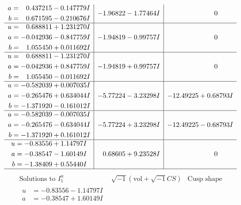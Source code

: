 \documentclass[1p]{elsarticle_modified}
\theoremstyle{definition}
\newcommand{\I}{\sqrt{-1}}
\begin{document}
$$\begin{array}{c|c|c}
\begin{aligned}
a &= \phantom{-}0.437215 - 0.147779 I \\
b &= \phantom{-}0.671595 - 0.210676 I\end{aligned}
 & -1.96822 - 1.77464 I & \phantom{-0.000000 } 0 \\ \hline\begin{aligned}
u &= \phantom{-}0.688811 + 1.231270 I \\
a &= -0.042936 - 0.847759 I \\
b &= \phantom{-}1.055450 + 0.011692 I\end{aligned}
 & -1.94819 - 0.99757 I & \phantom{-0.000000 } 0 \\ \hline\begin{aligned}
u &= \phantom{-}0.688811 - 1.231270 I \\
a &= -0.042936 + 0.847759 I \\
b &= \phantom{-}1.055450 - 0.011692 I\end{aligned}
 & -1.94819 + 0.99757 I & \phantom{-0.000000 } 0 \\ \hline\begin{aligned}
u &= -0.582039 + 0.007035 I \\
a &= -0.265476 + 0.634044 I \\
b &= -1.371920 - 0.161012 I\end{aligned}
 & -5.77224 - 3.23298 I & -12.49225 + 0.68793 I \\ \hline\begin{aligned}
u &= -0.582039 - 0.007035 I \\
a &= -0.265476 - 0.634044 I \\
b &= -1.371920 + 0.161012 I\end{aligned}
 & -5.77224 + 3.23298 I & -12.49225 - 0.68793 I \\ \hline\begin{aligned}
u &= -0.83556 + 1.14797 I \\
a &= -0.38547 - 1.60149 I \\
b &= -1.38409 + 0.55440 I\end{aligned}
 & \phantom{-}0.68605 + 9.23528 I & \phantom{-0.000000 } 0\\
 \hline 
 \end{array}$$\newpage$$\begin{array}{c|c|c}  
\text{Solutions to }I^u_{1}& \I (\text{vol} + \sqrt{-1}CS) & \text{Cusp shape}\\
 \hline 
\begin{aligned}
u &= -0.83556 - 1.14797 I \\
a &= -0.38547 + 1.60149 I \\

\end{aligned}
\end{array}$$
\end{document}
